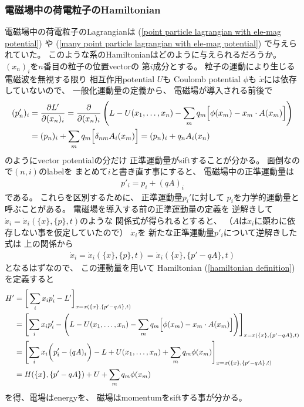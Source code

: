 \subsubsection{電磁場中の荷電粒子のHamiltonian}

電磁場中の荷電粒子のLagrangianは
(\ref{point particle lagrangian with ele-mag potential})
や
(\ref{many point particle lagrangian with ele-mag potential})
で与えられていた。
このような系のHamiltonianはどのように与えられるだろうか。
$(x_n)_i$を$n$番目の粒子の位置vectorの
第$i$成分とする。
粒子の運動により生じる電磁波を無視する限り
相互作用potential $U$も
Coulomb potential $\phi$も
$\dot{x}$には依存していないので、
一般化運動量の定義から、
電磁場が導入される前後で
\begin{align}
  (p_n')_i
  &=
  \dfrac{\partial L'}{\partial (x_n)_i}
  =
  \dfrac{\partial}{\partial (x_n)_i}
  \left(
    L
  -
    U(x_1, \dots, x_n)
  -
    \sum_m
    q_m
    \Big[
      \phi(x_m)
    -
      x_m \cdot A(x_m)
    \Big]
  \right)
\notag\\&
  =
  (p_n)_i
  +
  \sum_m
    q_m
    \Big[
      \delta_{nm} A_i(x_m)
    \Big]
=
  (p_n)_i
  +
  q_n
  A_i(x_n)
\end{align}
のようにvector potentialの分だけ
正準運動量がsiftすることが分かる。
面倒なので$(n,i)$のlabelを
まとめて$i$と書き直す事にすると、
電磁場中の正準運動量は
\begin{align}
  p'_i = p_i + (q A)_i
\label{canonical momentum in em field}
\end{align}
である。
これらを区別するために、
正準運動量$p_i'$に対して
$p_i$を力学的運動量と呼ぶことがある。
電磁場を導入する前の正準運動量の定義を
逆解きして
$\dot{x}_i = \dot{x}_i(\{x\},\{p\},t)$のような
関係式が得られるとすると、
（$A$は$\dot{x}_i$に顕わに依存しない事を仮定していたので）
$\dot{x}_i$を
新たな正準運動量$p'_i$について逆解きした式は
上の関係から
\begin{align}
  \dot{x}_i = \dot{x}_i(\{x\},\{p\},t)
  =
  \dot{x}_i(\{x\},\{p' - q A\},t)
\end{align}
となるはずなので、
この運動量を用いて
Hamiltonian
(\ref{hamiltonian definition})を定義すると
\begin{align}
  H'
  &=
  \bigg[
    \sum_i
      x_i p'_i
  - L'
  \bigg]_{
    x =
    x(\{x\},\{p' - q A\},t)
  }
\notag\\&
  =
  \left[
    \sum_i
      x_i
      p_i'
  -
  \left(
    L
  -
    U(x_1, \dots, x_n)
  -
    \sum_m
    q_m
    \Big[
      \phi(x_m)
    -
      x_m \cdot A(x_m)
    \Big]
  \right)
  \right]_{
    x
    =
    x(\{x\},\{p' - qA\},t)
  }
\notag\\&
  =
  \left[
    \sum_i
      x_i
      \bigg(
        p_i' - (q A)_i
      \bigg)
      -
      L
  +
    U(x_1, \dots, x_n)
  +
    \sum_m
    q_m
      \phi(x_m)
  \right]_{
    x
    =
    x(\{x\},\{p' - qA\},t)
  }
\notag\\&
  =
    H(\{x\},\{p' - qA\})
  +
    U
  +
  \sum_m
    q_m
    \phi(x_m)
\label{point charge hamiltonian}
\end{align}
を得、電場はenergyを、
磁場はmomentumをsiftする事が分かる。

